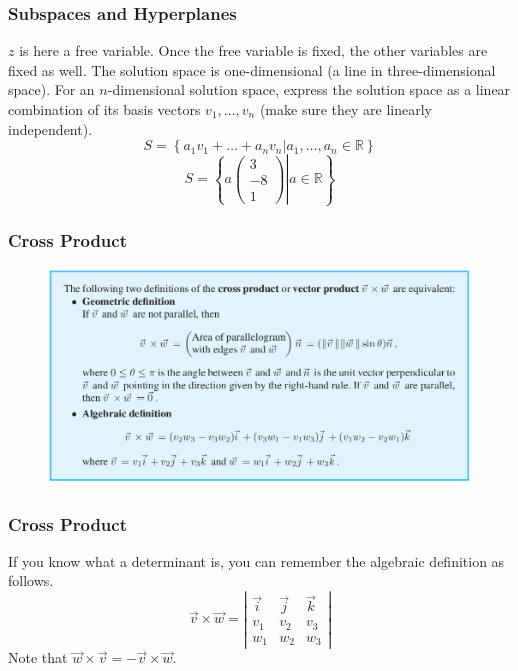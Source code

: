 \documentclass[xcolor=dvipsnames]{beamer}
\begin{document}
\begin{frame}
  \frametitle{Subspaces and Hyperplanes}
  $z$ is here a free variable. Once the free variable is fixed, the
  other variables are fixed as well. The solution space is
  one-dimensional (a line in three-dimensional space). For an
  $n$-dimensional solution space, express the solution space as a
  linear combination of its basis vectors $v_{1},{\ldots},v_{n}$ (make
  sure they are linearly independent). 
  \begin{equation}
    \label{eq:geeduboh}
    S=\left\{a_{1}v_{1}+{\ldots}+a_{n}v_{n}|a_{1},{\ldots},a_{n}\in\mathbb{R}\right\}
  \end{equation}
  \begin{equation}
    \label{eq:shoxuqui}
    S=\left.\left\{a\left(
        \begin{array}{c}
          3 \\
          -8 \\
          1
        \end{array}\right)\right\vert{}a\in\mathbb{R}\right\}
  \end{equation}
\end{frame}

\begin{frame}
  \frametitle{Cross Product}
  \begin{figure}[h]
    \includegraphics[scale=0.32]{./diagrams/crossproduct.png}
  \end{figure}
\end{frame}

\begin{frame}
  \frametitle{Cross Product}
  If you know what a determinant is, you can remember the algebraic
  definition as follows.
  \begin{equation}
    \label{eq:abeekohc}
    \vec{v}\times\vec{w}=\left\vert
      \begin{array}{ccc}
        \vec{i} & \vec{j} & \vec{k} \\
        v_{1} & v_{2} & v_{3} \\
        w_{1} & w_{2} & w_{3}
      \end{array}\right\vert
  \end{equation}
  Note that $\vec{w}\times\vec{v}=-\vec{v}\times\vec{w}$.
\end{frame}
\end{document}
